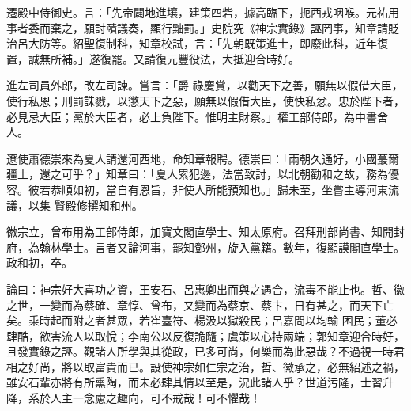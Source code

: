\begin{pinyinscope}
 遷殿中侍御史。言：「先帝闢地進壤，建策四砦，據高臨下，扼西戎咽喉。元祐用事者委而棄之，願討賾議奏，顯行黜罰。」史院究《神宗實錄》誣罔事，知章請貶治呂大防等。紹聖復制科，知章校試，言：「先朝既策進士，即廢此科，近年復置，誠無所補。」遂復罷。又請復元豐役法，大抵迎合時好。



 進左司員外郎，改左司諫。嘗言：「爵
 祿慶賞，以勸天下之善，願無以假借大臣，使行私恩；刑罰誅戮，以懲天下之惡，願無以假借大臣，使快私忿。忠於陛下者，必見忌大臣；黨於大臣者，必上負陛下。惟明主財察。」權工部侍郎，為中書舍人。



 遼使蕭德崇來為夏人請還河西地，命知章報聘。德崇曰：「兩朝久通好，小國蕞爾疆土，還之可乎？」知章曰：「夏人累犯邊，法當致討，以北朝勸和之故，務為優容。彼若恭順如初，當自有恩旨，非使人所能預知也。」歸未至，坐嘗主導河東流議，以集
 賢殿修撰知和州。



 徽宗立，曾布用為工部侍郎，加寶文閣直學士、知太原府。召拜刑部尚書、知開封府，為翰林學士。言者又論河事，罷知鄧州，旋入黨籍。數年，復顯謨閣直學士。政和初，卒。



 論曰：神宗好大喜功之資，王安石、呂惠卿出而與之遇合，流毒不能止也。哲、徽之世，一變而為蔡確、章惇、曾布，又變而為蔡京、蔡卞，日有甚之，而天下亡矣。乘時起而附之者甚眾，若崔臺符、楊汲以獄殺民；呂嘉問以均輸
 困民；董必肆酷，欲害流人以取悅；李南公以反復詭隨；虞策以心持兩端；郭知章迎合時好，且發實錄之誣。觀諸人所學與其從政，已多可尚，何樂而為此惡哉？不過視一時君相之好尚，將以取富貴而已。設使神宗如仁宗之治，哲、徽承之，必無紹述之禍，雖安石輩亦將有所熏陶，而未必肆其情以至是，況此諸人乎？世道污隆，士習升降，系於人主一念慮之趣向，可不戒哉！可不懼哉！



\end{pinyinscope}